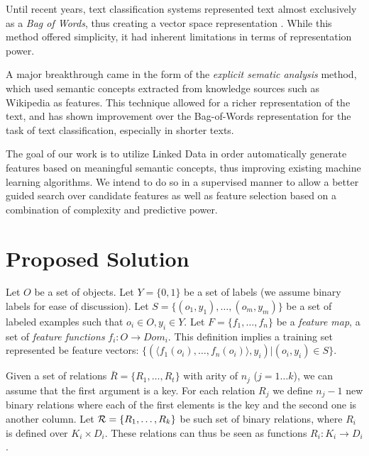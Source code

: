 \documentclass[12pt, a4paper]{article}
\theoremstyle{definition}
\begin{document}
Until recent years, text classification systems represented text almost exclusively as a \emph{Bag of Words}, thus creating a vector space representation \citep{salton1983introduction,Wu:1981:CST:1013228.511759}. While this method offered simplicity, it had inherent limitations in terms of representation power.

A major breakthrough came in the form of the \emph{explicit sematic analysis} \citep{gabrilovich2006overcoming} method, which used semantic concepts extracted from knowledge sources such as Wikipedia as features. This technique allowed for a richer representation of the text, and has shown improvement over the Bag-of-Words representation for the task of text classification, especially in shorter texts.

The goal of our work is to utilize Linked Data in order automatically generate features based on meaningful semantic concepts, thus improving existing machine learning algorithms. We intend to do so in a supervised manner to allow a better guided search over candidate features as well as feature selection based on a combination of complexity and predictive power.

\section{Proposed Solution}

Let $O$ be a set of objects. Let $Y=\{0,1\}$ be a set of labels (we assume binary labels for ease of discussion). Let $S=\{(o_{1},y_{1}),\ldots,(o_{m},y_{m})\}$ be a set of labeled examples such that $o_{i}\in O, y_{i}\in Y$. Let $F=\{f_{1},\ldots,f_{n}\}$ be a \emph{feature map}, a set of \emph{feature functions} $f_{i}:O\rightarrow Dom_{i}$.  This definition implies a training set represented be feature vectors: $\{ (\langle f_1(o_i),\ldots,f_n(o_i)\rangle, y_i) | (o_i,y_i) \in S\}$.

Given a set of relations $\bar{R}=\{R_{1},\ldots,R_{t}\}$ with arity of $n_{j}$ ($j=1\ldots k$), we can assume  that the first argument is a key. For each relation $R_{j}$ we define $n_{j}-1$ new binary relations where each of the first elements is the key and the second one is another column.
Let ${\cal R}=\{R_{1},\ldots,R_{k}\}$ be such set of binary relations, where $R_{i}$ is defined over $K_{i}\times D_{i}$. These relations can thus be seen as functions $R_{i}: K_{i}\rightarrow D_{i}$.
\end{document}
